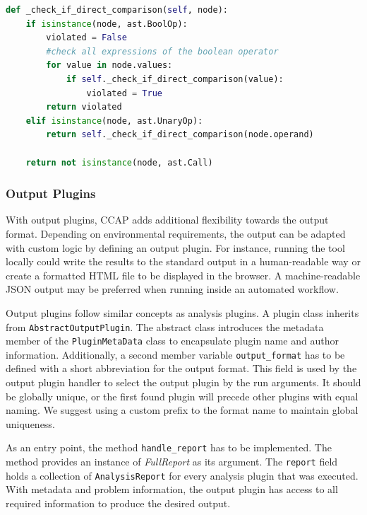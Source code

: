 \begin{lstlisting}[float, floatplacement=h, language=Python, label=lst:condition_coparison, caption={Recursive function to analyse an if statement for direct comparisons. Since a condition should contain a method call, the function returns False if this is not the case.}]
def _check_if_direct_comparison(self, node):
    if isinstance(node, ast.BoolOp):
        violated = False
        #check all expressions of the boolean operator
        for value in node.values:
            if self._check_if_direct_comparison(value):
                violated = True
        return violated
    elif isinstance(node, ast.UnaryOp):
        return self._check_if_direct_comparison(node.operand)

    return not isinstance(node, ast.Call)\end{lstlisting}

\subsubsection{Output Plugins}
With output plugins, CCAP adds additional flexibility towards the output format. Depending on environmental requirements, the output can be adapted with custom logic by defining an output plugin. For instance, running the tool locally could write the results to the standard output in a human-readable way or create a formatted HTML file to be displayed in the browser. A machine-readable JSON output may be preferred when running inside an automated workflow.

Output plugins follow similar concepts as analysis plugins. A plugin class inherits from \texttt{AbstractOutputPlugin}. The abstract class introduces the metadata member of the \texttt{PluginMetaData} class to encapsulate plugin name and author information. Additionally, a second member variable \texttt{output\_format} has to be defined with a short abbreviation for the output format. This field is used by the output plugin handler to select the output plugin by the run arguments. It should be globally unique, or the first found plugin will precede other plugins with equal naming. We suggest using a custom prefix to the format name to maintain global uniqueness.

As an entry point, the method \texttt{handle\_report} has to be implemented. The method provides an instance of \textit{FullReport} as its argument. The \texttt{report} field holds a collection of \texttt{AnalysisReport} for every analysis plugin that was executed. With metadata and problem information, the output plugin has access to all required information to produce the desired output.

